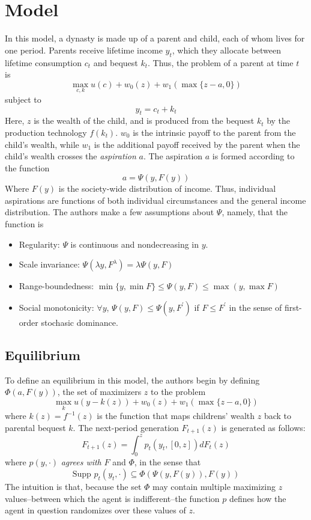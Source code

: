 \documentclass[11pt]{article}
\begin{document}
    \section{Model}
    In this model, a dynasty is made up of a parent and child, each of whom lives for one period. Parents receive lifetime income \( y_t \), which they allocate between lifetime consumption \( c_t \) and bequest \( k_t \). Thus, the problem of a parent at time \( t \) is 
    \[\max_{c, k} u(c) + w_0(z) + w_1(\max\{z - a, 0\})\]
    subject to 
    \[y_t = c_t + k_t\]
    Here, \( z \) is the wealth of the child, and is produced from the bequest \( k_t \) by the production technology \( f(k_t) \). \( w_0 \) is the intrinsic payoff to the parent from the child's wealth, while \( w_1 \) is the additional payoff received by the parent when the child's wealth crosses the \textit{aspiration} \( a \). The aspiration \( a \) is formed according to the function
    \[a = \Psi(y, F(y))\]
    Where \( F(y) \) is the society-wide distribution of income. Thus, individual aspirations are functions of both individual circumstances and the general income distribution. The authors make a few assumptions about \( \Psi \), namely, that the function is 
    \begin{itemize}
        \item Regularity: \( \Psi \) is continuous and nondecreasing in \( y \). 
        \item Scale invariance: \(\Psi(\lambda y, F^\lambda) = \lambda\Psi(y, F) \)
        \item  Range-boundedness: $\min\{y, \min F\} \leq \Psi(y, F) \leq \max(y, \max F)$ 
        \item  Social monotonicity: $\forall y$, $\Psi(y,F) \leq \Psi(y, F^\prime)$ if $F \leq F^\prime$ in the sense of first-order stochasic dominance. 
    \end{itemize}
        \subsection{Equilibrium}
        To define an equilibrium in this model, the authors begin by defining \( \Phi(a, F(y)) \), the set of maximizers \( z \) to the problem
        \begin{equation}
            \max_k u\left( y - k(z) \right) + w_0(z) + w_1(\max\{z - a, 0\}) \label{problem}
        \end{equation}
        where \( k(z) = f^{-1}(z) \) is the function that maps childrens' wealth \( z \) back to parental bequest \( k \). The next-period generation \( F_{t + 1}(z) \) is generated as follows:
        \[F_{t + 1}(z) = \int_{0}^{z}p_t(y_t, [0, z])dF_t(z)\]
        where \( p(y, \cdot) \) \textit{agrees with} \( F \) and \( \Phi \), in the sense that 
        \[\text{Supp } p_t(y_t, \cdot) \subseteq \Phi\left( \Psi(y, F(y)), F(y) \right)\]
        The intuition is that, because the set \( \Phi \) may contain multiple maximizing \( z \) values--between which the agent is indifferent--the function \( p \) defines how the agent in question randomizes over these values of \( z \).
\end{document}
